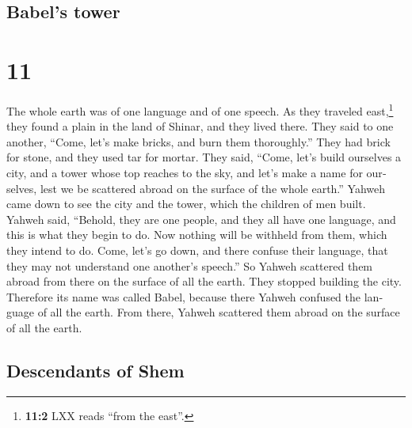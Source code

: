 \begin{paracol}{2}
\switchcolumn
\begin{otherlanguage}{english}

\hypertarget{babels-tower}{%
\subsection{Babel's tower}\label{babels-tower}}

\hypertarget{section-21}{%
\section{11}\label{section-21}}

 The whole earth was of one language and of one speech.
 As they traveled east,\footnote{\textbf{11:2} LXX reads
  ``from the east''.} they found a plain in the land of Shinar, and they
lived there.  They said to one another, ``Come, let's make
bricks, and burn them thoroughly.'' They had brick for stone, and they
used tar for mortar.  They said, ``Come, let's build
ourselves a city, and a tower whose top reaches to the sky, and let's
make a name for ourselves, lest we be scattered abroad on the surface of
the whole earth.''  Yahweh came down to see the city and
the tower, which the children of men built.  Yahweh said,
``Behold, they are one people, and they all have one language, and this
is what they begin to do. Now nothing will be withheld from them, which
they intend to do.  Come, let's go down, and there confuse
their language, that they may not understand one another's speech.''
 So Yahweh scattered them abroad from there on the surface
of all the earth. They stopped building the city. 
Therefore its name was called Babel, because there Yahweh confused the
language of all the earth. From there, Yahweh scattered them abroad on
the surface of all the earth.

\hypertarget{descendants-of-shem}{%
\subsection{Descendants of Shem}\label{descendants-of-shem}}


\end{otherlanguage}
\end{paracol}
